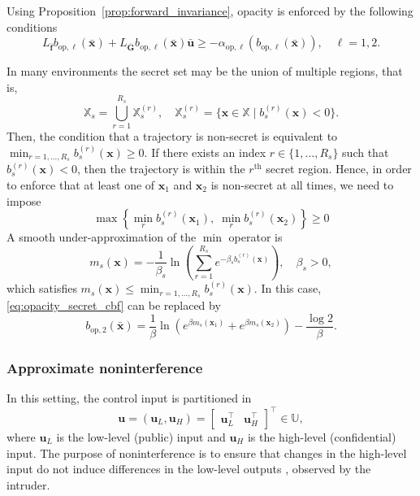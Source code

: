\documentclass[journal,twoside,web]{ieeecolor}
\begin{document}
Using Proposition~\ref{prop:forward_invariance}, opacity is enforced by the following conditions
\begin{equation} \label{eq:opacity_cbf_constraints}
    L_{\bar{\mathbf{f}}} b_{\mathrm{op},\ell}(\bar{\mathbf{x}}) + L_{\bar{\mathbf{G}}} b_{\mathrm{op},\ell}(\bar{\mathbf{x}})\bar{\mathbf{u}} \ge -\alpha_{\mathrm{op},\ell} \left( b_{\mathrm{op},\ell}(\bar{\mathbf{x}}) \right), \quad \ell=1,2.
\end{equation}

In many environments the secret set may be the union of multiple regions, that is,
\[
    \mathbb{X}_s = \bigcup_{r=1}^{R_s} \mathbb{X}_s^{(r)}, \quad \mathbb{X}_s^{(r)} = \big\{ \mathbf{x} \in \mathbb{X} \mid b_s^{(r)}(\mathbf{x})<0 \big\}.
\]
Then, the condition that a trajectory is non-secret is equivalent to $\min_{r=1, \dots, R_s} b_s^{(r)}(\mathbf{x}) \ge 0$. If there exists an index $r \in \{1, \dots, R_s\}$ such that $b_s^{(r)}(\mathbf{x}) < 0$, then the trajectory is within the $r^{\mathrm{th}}$ secret region. Hence, in order to enforce that at least one of $\mathbf{x}_1$ and $\mathbf{x}_2$ is non-secret at all times, we need to impose
\[
    \max \! \left\{ \min_{r} b_s^{(r)}(\mathbf{x}_1),\; \min_{r} b_s^{(r)}(\mathbf{x}_2) \right\} \ge 0
\]
A smooth under-approximation of the $\min$ operator is
\begin{equation}
    m_s(\mathbf{x}) = -\frac{1}{\beta_s} \ln \left( \sum_{r=1}^{R_s} e^{-\beta_s b_s^{(r)}(\mathbf{x})} \right), \quad \beta_s > 0,
\end{equation}
which satisfies $m_s(\mathbf{x}) \le \min_{r = 1, \dots, R_s} b_s^{(r)}(\mathbf{x})$. In this case, \eqref{eq:opacity_secret_cbf} can be replaced by
\begin{equation} \label{eq:opacity_multiple_secret_cbf}
    b_{\mathrm{op},2}(\bar{\mathbf{x}}) = \frac{1}{\beta} \ln \left( e^{\beta m_s(\mathbf{x}_1)} + e^{\beta m_s(\mathbf{x}_2)} \right) - \frac{\log 2}{\beta}.
\end{equation}

\subsubsection{Approximate noninterference}

In this setting, the control input is partitioned in
\begin{equation*}
\label{eq:input_partition}
    \mathbf{u} = (\mathbf{u}_{L}, \mathbf{u}_{H}) = \begin{bmatrix} \mathbf{u}_{L}^{\top} & \mathbf{u}_{H}^{\top} \end{bmatrix}^{\top} \in \mathbb{U},
\end{equation*}
where $\mathbf{u}_{L}$ is the low-level (public) input and $\mathbf{u}_{H}$ is the high-level (confidential) input. The purpose of noninterference is to ensure that changes in the high-level input do not induce differences in the low-level outputs \cite{xiang2021}, observed by the intruder.
\end{document}
